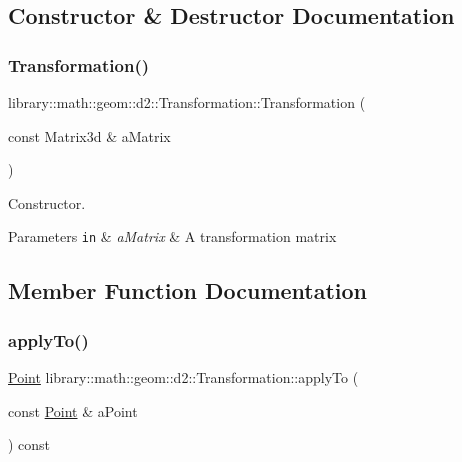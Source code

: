 \subsection{Constructor \& Destructor Documentation}
\mbox{\label{classlibrary_1_1math_1_1geom_1_1d2_1_1_transformation_a6f284b8a89b0a6db0d5bd4fb13bf2d38}} 
\subsubsection{\texorpdfstring{Transformation()}{Transformation()}}
{\footnotesize\ttfamily library\+::math\+::geom\+::d2\+::\+Transformation\+::\+Transformation (\begin{DoxyParamCaption}\item[{const Matrix3d \&}]{a\+Matrix }\end{DoxyParamCaption})}



Constructor. 


\begin{DoxyParams}[1]{Parameters}
\mbox{\tt in}  & {\em a\+Matrix} & A transformation matrix \\
\hline
\end{DoxyParams}


\subsection{Member Function Documentation}
\mbox{\label{classlibrary_1_1math_1_1geom_1_1d2_1_1_transformation_a03f3bc115d7db05f3351ae9095a69b65}} 
\subsubsection{\texorpdfstring{apply\+To()}{applyTo()}\hspace{0.1cm}{\footnotesize\ttfamily [1/3]}}
{\footnotesize\ttfamily \hyperlink{classlibrary_1_1math_1_1geom_1_1d2_1_1objects_1_1_point}{Point} library\+::math\+::geom\+::d2\+::\+Transformation\+::apply\+To (\begin{DoxyParamCaption}\item[{const \hyperlink{classlibrary_1_1math_1_1geom_1_1d2_1_1objects_1_1_point}{Point} \&}]{a\+Point }\end{DoxyParamCaption}) const}

